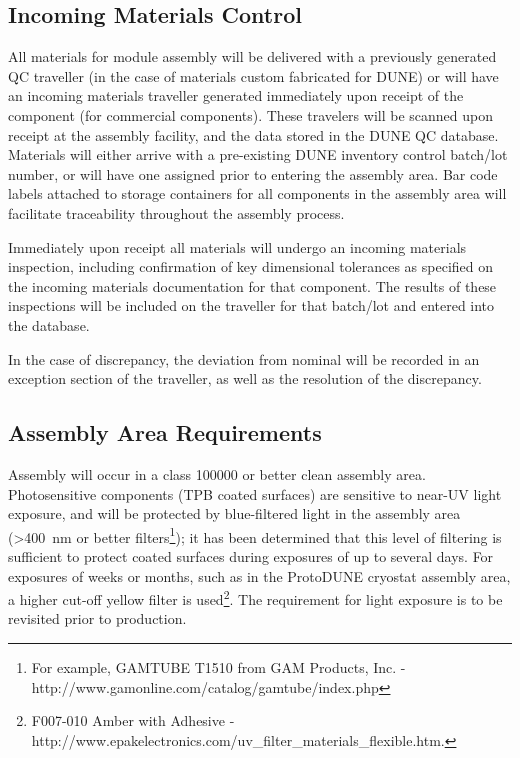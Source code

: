 \subsection{Incoming Materials Control}

All materials for  module assembly will be delivered with a previously generated QC traveller (in the case of materials custom fabricated for DUNE) or will have an incoming materials traveller generated immediately upon receipt of the component (for commercial components).  These travelers will be scanned upon receipt at the assembly facility, and the data stored in the DUNE QC database.  Materials will either arrive with a pre-existing DUNE inventory control batch/lot number, or will have one assigned prior to entering the assembly area.  Bar code labels attached to storage containers for all components in the assembly area will facilitate traceability throughout the assembly process.

Immediately upon receipt all materials will undergo an incoming materials inspection, including confirmation of key dimensional tolerances as specified on the incoming materials documentation for that component.  The results of these inspections will be included on the traveller for that batch/lot and entered into the database.

In the case of discrepancy, the deviation from nominal will be recorded in an exception section of the traveller, as well as the resolution of the discrepancy.

\subsection{Assembly Area Requirements}

Assembly will occur in a class \num{100000} or better clean assembly area.  Photosensitive components (TPB coated surfaces) are sensitive to near-UV light exposure, and will be protected by blue-filtered light in the assembly area (>\SI{400}{nm} or better filters\footnote{For example, GAMTUBE T1510 from GAM Products, Inc. - http://www.gamonline.com/catalog/gamtube/index.php}); it has been determined that this level of filtering is sufficient to protect coated surfaces during  exposures of up to several days. For exposures of weeks or months, such as in the ProtoDUNE cryostat assembly area, a higher cut-off yellow filter is used\footnote{F007-010 Amber with Adhesive - http://www.epakelectronics.com/uv\_filter\_materials\_flexible.htm.}. 
The requirement for light exposure is to be revisited prior to  production.

